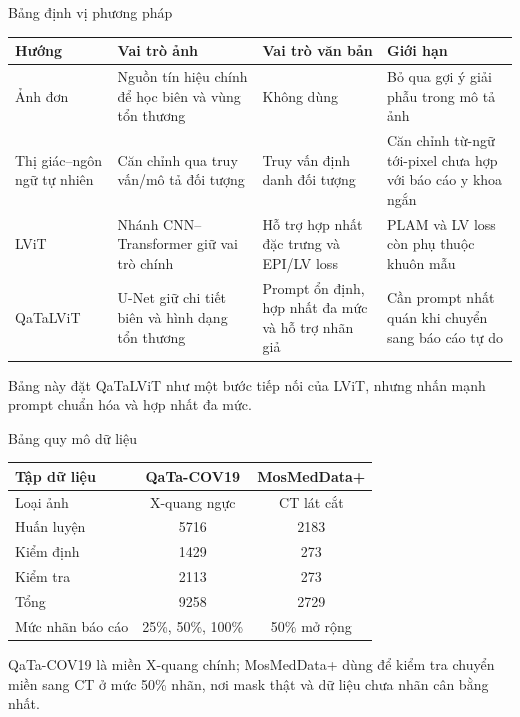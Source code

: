 \documentclass[aspectratio=169,11pt]{beamer}
\newcommand{\smallnote}[1]{%
  \par
  \vspace{0.12cm}
  {\footnotesize\color{ink}#1\par}
}
\begin{document}
\begin{frame}{Bảng định vị phương pháp}
  \scriptsize
  \renewcommand{\arraystretch}{1.14}
  \begin{tabularx}{\textwidth}{@{}lXXX@{}}
    \toprule
    \textbf{Hướng} & \textbf{Vai trò ảnh} & \textbf{Vai trò văn bản} & \textbf{Giới hạn} \\
    \midrule
    Ảnh đơn & Nguồn tín hiệu chính để học biên và vùng tổn thương & Không dùng & Bỏ qua gợi ý giải phẫu trong mô tả ảnh \\
    Thị giác--ngôn ngữ tự nhiên & Căn chỉnh qua truy vấn/mô tả đối tượng & Truy vấn định danh đối tượng & Căn chỉnh từ-ngữ tới-pixel chưa hợp với báo cáo y khoa ngắn \\
    LViT & Nhánh CNN--Transformer giữ vai trò chính & Hỗ trợ hợp nhất đặc trưng và EPI/LV loss & PLAM và LV loss còn phụ thuộc khuôn mẫu \\
    QaTaLViT & U-Net giữ chi tiết biên và hình dạng tổn thương & Prompt ổn định, hợp nhất đa mức và hỗ trợ nhãn giả & Cần prompt nhất quán khi chuyển sang báo cáo tự do \\
    \bottomrule
  \end{tabularx}
  \smallnote{Bảng này đặt QaTaLViT như một bước tiếp nối của LViT, nhưng nhấn mạnh prompt chuẩn hóa và hợp nhất đa mức.}
\end{frame}

\begin{frame}{Bảng quy mô dữ liệu}
  \centering
  \renewcommand{\arraystretch}{1.18}
  \begin{tabular}{lcc}
    \toprule
    \textbf{Tập dữ liệu} & \textbf{QaTa-COV19} & \textbf{MosMedData+} \\
    \midrule
    Loại ảnh & X-quang ngực & CT lát cắt \\
    Huấn luyện & 5716 & 2183 \\
    Kiểm định & 1429 & 273 \\
    Kiểm tra & 2113 & 273 \\
    Tổng & 9258 & 2729 \\
    Mức nhãn báo cáo & 25\%, 50\%, 100\% & 50\% mở rộng \\
    \bottomrule
  \end{tabular}
  \smallnote{QaTa-COV19 là miền X-quang chính; MosMedData+ dùng để kiểm tra chuyển miền sang CT ở mức 50\% nhãn, nơi mask thật và dữ liệu chưa nhãn cân bằng nhất.}
\end{frame}
\end{document}
